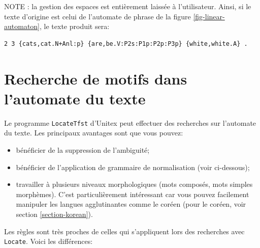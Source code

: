 \bigskip
\noindent NOTE : la gestion des espaces est entièrement laissée à l’utilisateur. 
Ainsi, si le texte d’origine est celui de l’automate de phrase de la figure 
\ref{fig-linear-automaton}, le texte produit sera:

\begin{verbatim}
2 3 {cats,cat.N+Anl:p} {are,be.V:P2s:P1p:P2p:P3p} {white,white.A} .
\end{verbatim}


\section{Recherche de motifs dans l'automate du texte}
\label{section-locate-tfst}
Le programme \verb+LocateTfst+ d'Unitex peut effectuer des recherches sur l'automate du texte.
Les principaux avantages sont que vous pouvez:
\begin{itemize}
\item bénéficier de la suppression de l'ambiguité;
\item bénéficier de l'application de grammaire de normalisation (voir ci-dessous);
    \item travailler à plusieurs niveaux morphologiques (mots composés, mots simples morphèmes).
    	    C'est particulièrement intéressant car vous pouvez facilement manipuler les langues agglutinantes comme le coréen (pour le coréen, voir
    section \ref{section-korean}).
\end{itemize}

 
\bigskip
\noindent Les règles sont très proches de celles qui s'appliquent lors des recherches avec
\verb+Locate+. Voici les différences:

